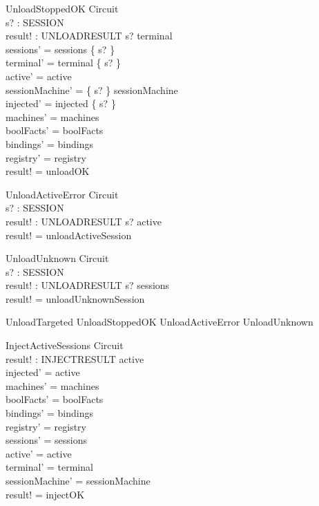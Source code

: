 \documentclass[a4paper,10pt,fleqn]{article}
\begin{document}
\begin{schema}{UnloadStoppedOK}
  \Delta Circuit \\
  s? : SESSION \\
  result! : UNLOADRESULT
\where
  s? \in terminal \\
  sessions' = sessions \setminus \{ s? \} \\
  terminal' = terminal \setminus \{ s? \} \\
  active' = active \\
  sessionMachine' = \{ s? \} \ndres sessionMachine \\
  injected' = injected \setminus \{ s? \} \\
  machines' = machines \\
  boolFacts' = boolFacts \\
  bindings' = bindings \\
  registry' = registry \\
  result! = unloadOK
\end{schema}

\begin{schema}{UnloadActiveError}
  \Xi Circuit \\
  s? : SESSION \\
  result! : UNLOADRESULT
\where
  s? \in active \\
  result! = unloadActiveSession
\end{schema}

\begin{schema}{UnloadUnknown}
  \Xi Circuit \\
  s? : SESSION \\
  result! : UNLOADRESULT
\where
  s? \notin sessions \\
  result! = unloadUnknownSession
\end{schema}

\begin{zed}
  UnloadTargeted  UnloadStoppedOK \lor UnloadActiveError \lor UnloadUnknown
\end{zed}

\begin{schema}{InjectActiveSessions}
  \Delta Circuit \\
  result! : INJECTRESULT
\where
  active \neq \emptyset \\
  injected' = active \\
  machines' = machines \\
  boolFacts' = boolFacts \\
  bindings' = bindings \\
  registry' = registry \\
  sessions' = sessions \\
  active' = active \\
  terminal' = terminal \\
  sessionMachine' = sessionMachine \\
  result! = injectOK
\end{schema}
\end{document}
